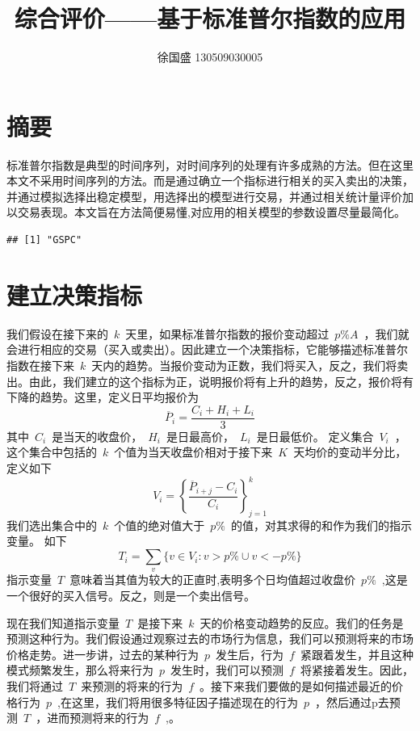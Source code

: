 \documentclass{article}\usepackage[]{graphicx}\usepackage[]{color}
\title{综合评价——基于标准普尔指数的应用}
\author{徐国盛 130509030005}
\makeatletter
\newenvironment{kframe}{%
 \def\at@end@of@kframe{}%
 \ifinner\ifhmode%
  \def\at@end@of@kframe{\end{minipage}}%
  \begin{minipage}{\columnwidth}%
 \fi\fi%
 \def\FrameCommand##1{\hskip\@totalleftmargin \hskip-\fboxsep
 \colorbox{shadecolor}{##1}\hskip-\fboxsep
     \hskip-\linewidth \hskip-\@totalleftmargin \hskip\columnwidth}%
 \MakeFramed {\advance\hsize-\width
   \@totalleftmargin\z@ \linewidth\hsize
   \@setminipage}}%
 {\par\unskip\endMakeFramed%
 \at@end@of@kframe}
\newenvironment{knitrout}{}{} %
\makeatother
\begin{document}
\begin{CJK*}{UTF8}{gkai}
\maketitle
\tableofcontents
\section{摘要}

标准普尔指数是典型的时间序列，对时间序列的处理有许多成熟的方法。但在这里本文不采用时间序列的方法。而是通过确立一个指标进行相关的买入卖出的决策，并通过模拟选择出稳定模型，用选择出的模型进行交易，并通过相关统计量评价加以交易表现。本文旨在方法简便易懂,对应用的相关模型的参数设置尽量最简化。


\begin{knitrout}
\color{fgcolor}\begin{kframe}
\begin{verbatim}
## [1] "GSPC"
\end{verbatim}
\end{kframe}
\end{knitrout}
\section{建立决策指标}

我们假设在接下来的~$k$~天里，如果标准普尔指数的报价变动超过~$p\%A$~，我们就会进行相应的交易（买入或卖出）。因此建立一个决策指标，它能够描述标准普尔指数在接下来~$k$~天内的趋势。当报价变动为正数，我们将买入，反之，我们将卖出。由此，我们建立的这个指标为正，说明报价将有上升的趋势，反之，报价将有下降的趋势。这里，定义日平均报价为
$$\overline{P}_i = \frac{C_i+H_i+L_i}{3}$$
其中~$C_i$~是当天的收盘价，~$H_i$~是日最高价，~$L_i$~是日最低价。
定义集合~$V_i$~，这个集合中包括的~$k$~个值为当天收盘价相对于接下来~$K$~天均价的变动半分比，定义如下
$$V_i = \left\{\frac{\overline{P}_{i+j}-C_i}{C_i}\right\}_{j=1}^k$$
我们选出集合中的~$k$~个值的绝对值大于~$p\%$~的值，对其求得的和作为我们的指示变量。
如下
$$T_i = \sum_v\{v\in V_i:v>p\%\cup v<-p\%\}$$
指示变量~$T$~意味着当其值为较大的正直时,表明多个日均值超过收盘价~$p\%$~,这是一个很好的买入信号。反之，则是一个卖出信号。

现在我们知道指示变量~$T$~是接下来~$k$~天的价格变动趋势的反应。我们的任务是预测这种行为。我们假设通过观察过去的市场行为信息，我们可以预测将来的市场价格走势。进一步讲，过去的某种行为~$p$~发生后，行为~$f$~紧跟着发生，并且这种
模式频繁发生，那么将来行为~$p$~发生时，我们可以预测~$f$~将紧接着发生。因此，我们将通过~$T$~来预测的将来的行为~$f$~。接下来我们要做的是如何描述最近的价格行为~$p$~,在这里，我们将用很多特征因子描述现在的行为~$p$~，然后通过p去预测~$T$~，进而预测将来的行为~$f$~,。


\end{CJK*}
\end{document}
